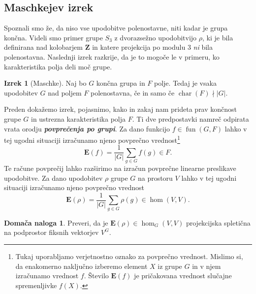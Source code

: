 \documentclass[11pt]{book}
\def\ZZ{\mathbf{Z}}
\def\EE{\mathbf{E}}
\DeclareMathOperator\characteristic{char}
\DeclareMathOperator\fun{fun}
\def\definicija{\color{rdeca}\bf\em}
\theoremstyle{definition}
\theoremstyle{zgled}
\theoremstyle{odprtproblem}
\theoremstyle{domacanaloga}
\newtheorem*{domacanaloga}{Domača naloga}
\theoremstyle{izrek}
\newtheorem*{izrek}{Izrek}
\begin{document}
\subsection{Maschkejev izrek}

Spoznali smo že, da niso vse upodobitve polenostavne, niti kadar je grupa končna. Videli smo primer grupe $S_3$ z dvorazsežno upodobitvijo $\rho$, ki je bila definirana nad kolobarjem $\ZZ$ in katere projekcija po modulu $3$ \emph{ni} bila polenostavna. Naslednji izrek razkrije, da je to mogoče le v primeru, ko karakteristika polja deli moč grupe.

\begin{izrek}[Maschke]
Naj bo $G$ končna grupa in $F$ polje. Tedaj je vsaka upodobitev $G$ nad poljem $F$ polenostavna, če in samo če $\characteristic(F) \nmid |G|$.
\end{izrek}

Preden dokažemo izrek, pojasnimo, kako in zakaj nam prideta prav končnost grupe $G$ in ustrezna karakteristika polja $F$. Ti dve predpostavki namreč odpirata vrata orodju {\definicija povprečenja po grupi}. Za dano funkcijo $f \in \fun(G,F)$ lahko v tej ugodni situaciji izračunamo njeno povprečno vrednost\footnote{Tukaj uporabljamo verjetnostno oznako za povprečno vrednost. Mislimo si, da enakomerno naključno izberemo element $X$ iz grupe $G$ in v njem izračunamo vrednost $f$. Število $\EE(f)$ je pričakovana vrednost slučajne spremenljivke $f(X)$.}
\[
    \EE(f) = \frac{1}{|G|} \sum_{g \in G} f(g) \in F.
\]
Te račune povprečij lahko razširimo na izračun povprečne linearne preslikave upodobitve. Za dano upodobitev $\rho$ grupe $G$ na prostoru $V$ lahko v tej ugodni situaciji izračunamo njeno povprečno vrednost
\[
    \EE(\rho) = \frac{1}{|G|} \sum_{g \in G} \rho(g) \in \hom(V,V).
\]

\begin{domacanaloga}
Preveri, da je $\EE(\rho) \in \hom_G(V,V)$ projekcijska spletična na podprostor fiksnih vektorjev $V^G$. 
\end{domacanaloga}
\end{document}
